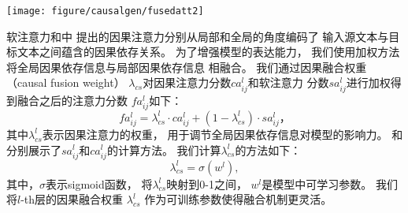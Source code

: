 \begin{figure*}[th]
	\centering
	\texttt{[image: figure/causalgen/fusedatt2]}
	\label{fig:causalgen-fusedatt}
\end{figure*}

软注意力和中
提出的因果注意力分别从局部和全局的角度编码了
输入源文本与目标文本之间蕴含的因果依存关系。
为了增强模型的表达能力，
我们使用加权方法将全局因果依存信息与局部因果依存信息
相融合。
我们通过因果融合权重（causal fusion weight）
$\lambda_{cs}$对因果注意力分数$ca^l_{ij}$和软注意力
分数$sa^l_{ij}$进行加权得到融合之后的注意力分数
$fa^l_{ij}$如下：
\begin{equation}
\label{eq:causalgen-fusion}
fa^l_{ij} = \lambda^{l}_{cs} \cdot ca^l_{ij} + (1-\lambda^{l}_{cs}) \cdot sa^l_{ij}，
\end{equation}
其中$\lambda^{l}_{cs}$表示因果注意力的权重，
用于调节全局因果依存信息对模型的影响力。
和
分别展示了$sa^l_{ij}$和$ca^l_{ij}$的计算方法。
我们计算$\lambda^l_{cs}$的方法如下：
\begin{equation}
\label{eq:causalgen-weight}
\lambda^l_{cs} = \sigma(w^l),
\end{equation}
其中，$\sigma$表示sigmoid函数，
将$\lambda^l_{cs}$映射到0-1之间，
$w^l$是模型中可学习参数。
我们将$l$-th层的因果融合权重
$\lambda^l_{cs}$
作为可训练参数使得融合机制更灵活。













	